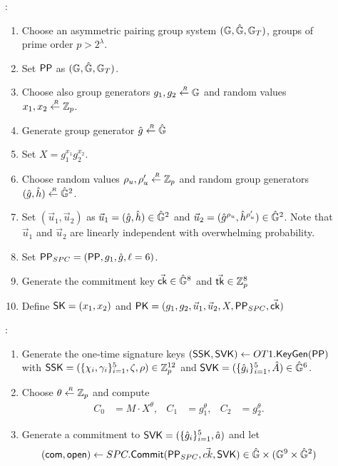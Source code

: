 \begin{description}

\item[]:
  \begin{enumerate}
  \item Choose an asymmetric pairing group system $(\mathbb{G}, \hat{\mathbb{G}}, \mathbb{G}_T)$, groups of prime order $p > 2^\lambda$.
  \item Set $\mathsf{PP}$ as $(\mathbb{G}, \hat{\mathbb{G}}, \mathbb{G}_T)$.
  \item Choose also group generators $g_1, g_2 \stackrel{{\scriptscriptstyle \mkern4mu R}}{\gets} \mathbb{G}$ and random values $x_1, x_2 \stackrel{{\scriptscriptstyle \mkern4mu R}}{\gets} \mathbb{Z}_p$.
  \item Generate group generator $\hat{g} \stackrel{{\scriptscriptstyle \mkern4mu R}}{\gets} \hat{\mathbb{G}}$
  \item Set $X = g_1^{x_1}g_2^{x_2}$.
  \item Choose random values $\rho_u,\rho_u' \stackrel{{\scriptscriptstyle \mkern4mu R}}{\gets} \mathbb{Z}_p$ and random group generators $(\hat{g}, \hat{h}) \stackrel{{\scriptscriptstyle \mkern4mu R}}{\gets} \hat{\mathbb{G}}^2$.
  \item Set $(\vec{u}_1, \vec{u}_2)$ as $\vec{u}_1 = (\hat{g}, \hat{h}) \in \hat{\mathbb{G}}^2$ and $\vec{u}_2 =  (\hat{g}^{\rho_u}, \hat{h}^{\rho_u'}) \in \hat{\mathbb{G}}^2$. Note that $\vec{u}_1$ and $\vec{u}_2$ are linearly independent with overwhelming probability.
  \item Set $\mathsf{PP}_{SPC} = (\mathsf{PP}, g_1, \hat{g}, \ell = 6)$.
  \item Generate the commitment key $\vec{\mathsf{ck}} \in \hat{\mathbb{G}}^8$ and $\vec{\mathsf{tk}} \in \mathbb{Z}_p^8$
  \item Define $\mathsf{SK} = (x_1, x_2)$ and $\mathsf{PK} = (g_1, g_2, \vec{u}_1, \vec{u}_2, X, \mathsf{PP}_{SPC}, \vec{\mathsf{ck}})$
  \end{enumerate}
\item[]:
  \begin{enumerate}
  \item Generate the one-time signature keys $(\mathsf{SSK}, \mathsf{SVK}) \gets OT1.{\mathsf{KeyGen}}(\mathsf{PP})$ with $\mathsf{SSK} = (\{\chi_i, \gamma_i\}_{i=1}^5, \zeta, \rho) \in \mathbb{Z}_p^{12}$ and $\mathsf{SVK} =  (\{\hat{g}_i\}_{i =1}^5,  \hat{A} ) \in \hat{\mathbb{G}}^6$.
  \item Choose $\theta \stackrel{{\scriptscriptstyle \mkern4mu R}}{\gets} \mathbb{Z}_p$ and compute
    \begin{align*}
      C_0 &= M\cdot X^{\theta}, & C_1 &= g_1^{\theta}, & C_2 &= g_2^{\theta}.
    \end{align*}
  \item Generate a commitment to $\mathsf{SVK} = (\{\hat{g}_i\}_{i =1}^5, \hat{a})$ and let 
    $$(\mathsf{com}, \mathsf{open}) \gets SPC.{\mathsf{Commit}}(\mathsf{PP}_{SPC}, \vec{ck}, \mathsf{SVK}) \in \hat{\mathbb{G}} \times (\mathbb{G}^9 \times \hat{\mathbb{G}}^2)$$

\end{enumerate}
\end{description}
